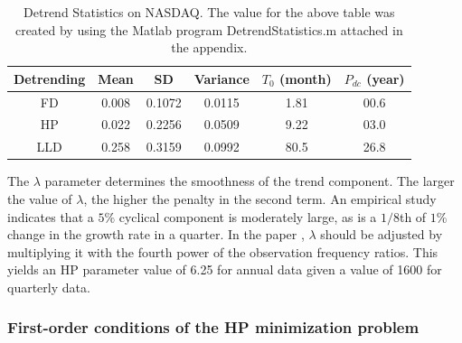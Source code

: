 \begin{table}[h!]
\centering
\begin{tabular}{||c c c c c c ||} 
 \hline
 Detrending & Mean & SD & Variance & $T_{0}$ (month) & $P_{dc}$ (year) \\ [0.5ex] 
 \hline\hline
 FD & 0.008 & 0.1072 & 0.0115 & 1.81 & 00.6 \\
 HP & 0.022 & 0.2256 & 0.0509 & 9.22 & 03.0 \\
 LLD & 0.258 & 0.3159 & 0.0992 & 80.5 & 26.8  \\
 \hline
\end{tabular}
\caption{Detrend Statistics on NASDAQ. The value for the above table was created by using the Matlab program DetrendStatistics.m attached in the appendix.  }
\label{table:sp500trendstat}
\end{table}

The $\lambda$ parameter determines the smoothness of the trend component. The larger the value of $\lambda$, the higher the penalty in the  second term.  An empirical study indicates that a $5\%$ cyclical component is moderately large, as is a $1/8$th of $1\%$ change in the growth rate in a quarter. In the paper \cite{lambdaforhp}, $\lambda$ should be adjusted by multiplying it with the fourth power of the observation frequency ratios. This yields an HP parameter value of 6.25 for annual data given a value of 1600 for quarterly data. 

\subsubsection{First-order conditions of the HP minimization problem}

